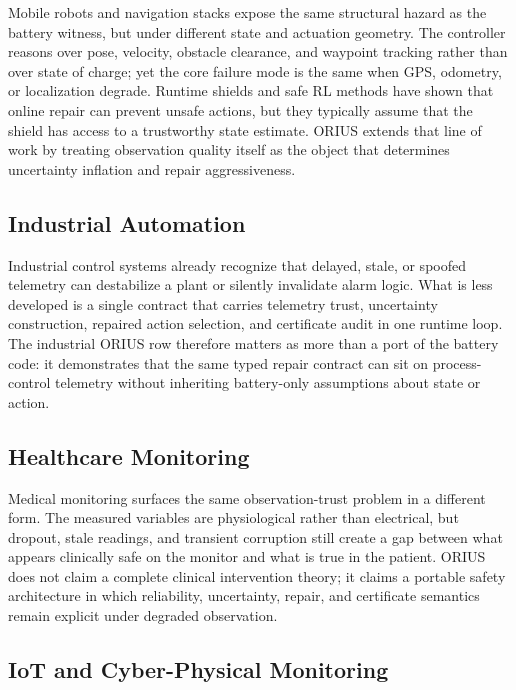 Mobile robots and navigation stacks expose the same structural hazard as the
battery witness, but under different state and actuation geometry.  The
controller reasons over pose, velocity, obstacle clearance, and waypoint
tracking rather than over state of charge; yet the core failure mode is the
same when GPS, odometry, or localization degrade.  Runtime shields and safe
RL methods have shown that online repair can prevent unsafe actions, but they
typically assume that the shield has access to a trustworthy state estimate.
ORIUS extends that line of work by treating observation quality itself as the
object that determines uncertainty inflation and repair aggressiveness.

\subsection{Industrial Automation}

Industrial control systems already recognize that delayed, stale, or spoofed
telemetry can destabilize a plant or silently invalidate alarm logic.  What
is less developed is a single contract that carries telemetry trust,
uncertainty construction, repaired action selection, and certificate audit in
one runtime loop.  The industrial ORIUS row therefore matters as more than a
port of the battery code: it demonstrates that the same typed repair
contract can sit on process-control telemetry without inheriting battery-only
assumptions about state or action.

\subsection{Healthcare Monitoring}

Medical monitoring surfaces the same observation-trust problem in a different
form.  The measured variables are physiological rather than electrical, but
dropout, stale readings, and transient corruption still create a gap between
what appears clinically safe on the monitor and what is true in the patient.
ORIUS does not claim a complete clinical intervention theory; it claims a
portable safety architecture in which reliability, uncertainty, repair, and
certificate semantics remain explicit under degraded observation.

\subsection{IoT and Cyber-Physical Monitoring}

